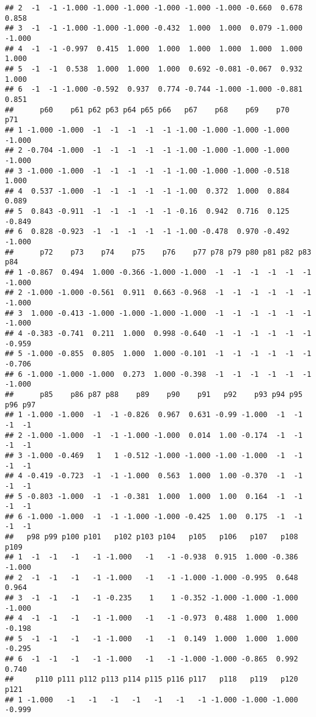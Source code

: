 \documentclass[]{article}
\begin{document}
\begin{verbatim}
## 2  -1  -1 -1.000 -1.000 -1.000 -1.000 -1.000 -1.000 -0.660  0.678  0.858
## 3  -1  -1 -1.000 -1.000 -1.000 -0.432  1.000  1.000  0.079 -1.000 -1.000
## 4  -1  -1 -0.997  0.415  1.000  1.000  1.000  1.000  1.000  1.000  1.000
## 5  -1  -1  0.538  1.000  1.000  1.000  0.692 -0.081 -0.067  0.932  1.000
## 6  -1  -1 -1.000 -0.592  0.937  0.774 -0.744 -1.000 -1.000 -0.881  0.851
##      p60    p61 p62 p63 p64 p65 p66   p67    p68    p69    p70    p71
## 1 -1.000 -1.000  -1  -1  -1  -1  -1 -1.00 -1.000 -1.000 -1.000 -1.000
## 2 -0.704 -1.000  -1  -1  -1  -1  -1 -1.00 -1.000 -1.000 -1.000 -1.000
## 3 -1.000 -1.000  -1  -1  -1  -1  -1 -1.00 -1.000 -1.000 -0.518  1.000
## 4  0.537 -1.000  -1  -1  -1  -1  -1 -1.00  0.372  1.000  0.884  0.089
## 5  0.843 -0.911  -1  -1  -1  -1  -1 -0.16  0.942  0.716  0.125 -0.849
## 6  0.828 -0.923  -1  -1  -1  -1  -1 -1.00 -0.478  0.970 -0.492 -1.000
##      p72    p73    p74    p75    p76    p77 p78 p79 p80 p81 p82 p83    p84
## 1 -0.867  0.494  1.000 -0.366 -1.000 -1.000  -1  -1  -1  -1  -1  -1 -1.000
## 2 -1.000 -1.000 -0.561  0.911  0.663 -0.968  -1  -1  -1  -1  -1  -1 -1.000
## 3  1.000 -0.413 -1.000 -1.000 -1.000 -1.000  -1  -1  -1  -1  -1  -1 -1.000
## 4 -0.383 -0.741  0.211  1.000  0.998 -0.640  -1  -1  -1  -1  -1  -1 -0.959
## 5 -1.000 -0.855  0.805  1.000  1.000 -0.101  -1  -1  -1  -1  -1  -1 -0.706
## 6 -1.000 -1.000 -1.000  0.273  1.000 -0.398  -1  -1  -1  -1  -1  -1 -1.000
##      p85    p86 p87 p88    p89    p90    p91   p92    p93 p94 p95 p96 p97
## 1 -1.000 -1.000  -1  -1 -0.826  0.967  0.631 -0.99 -1.000  -1  -1  -1  -1
## 2 -1.000 -1.000  -1  -1 -1.000 -1.000  0.014  1.00 -0.174  -1  -1  -1  -1
## 3 -1.000 -0.469   1   1 -0.512 -1.000 -1.000 -1.00 -1.000  -1  -1  -1  -1
## 4 -0.419 -0.723  -1  -1 -1.000  0.563  1.000  1.00 -0.370  -1  -1  -1  -1
## 5 -0.803 -1.000  -1  -1 -0.381  1.000  1.000  1.00  0.164  -1  -1  -1  -1
## 6 -1.000 -1.000  -1  -1 -1.000 -1.000 -0.425  1.00  0.175  -1  -1  -1  -1
##   p98 p99 p100 p101   p102 p103 p104   p105   p106   p107   p108   p109
## 1  -1  -1   -1   -1 -1.000   -1   -1 -0.938  0.915  1.000 -0.386 -1.000
## 2  -1  -1   -1   -1 -1.000   -1   -1 -1.000 -1.000 -0.995  0.648  0.964
## 3  -1  -1   -1   -1 -0.235    1    1 -0.352 -1.000 -1.000 -1.000 -1.000
## 4  -1  -1   -1   -1 -1.000   -1   -1 -0.973  0.488  1.000  1.000 -0.198
## 5  -1  -1   -1   -1 -1.000   -1   -1  0.149  1.000  1.000  1.000 -0.295
## 6  -1  -1   -1   -1 -1.000   -1   -1 -1.000 -1.000 -0.865  0.992  0.740
##     p110 p111 p112 p113 p114 p115 p116 p117   p118   p119   p120   p121
## 1 -1.000   -1   -1   -1   -1   -1   -1   -1 -1.000 -1.000 -1.000 -0.999

\end{verbatim}
\end{document}
